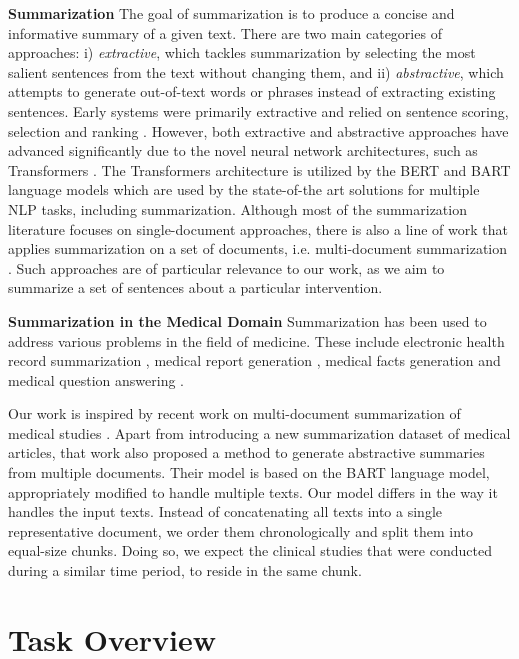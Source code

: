 \documentclass[11pt]{article}
\begin{document}
\textbf{Summarization} The goal of summarization is to produce a concise and informative summary of a given text. There are two main categories of approaches: i) \emph{extractive}, which tackles summarization by selecting the most salient sentences from the text without changing them, and ii) \emph{abstractive}, which attempts to generate out-of-text words or phrases instead of extracting existing sentences. Early systems were primarily extractive and relied on sentence scoring, selection and ranking \cite{allahyari2017text}. However, both extractive and abstractive approaches have advanced significantly due to the novel neural network architectures, such as Transformers \cite{vaswani2017attention}. The Transformers architecture is utilized by the BERT \cite{devlin2018bert} and BART \cite{lewis2019bart} language models which are used by the state-of-the art solutions for multiple NLP tasks, including summarization. Although most of the summarization literature focuses on single-document approaches, there is also a line of work that applies summarization on a set of documents, i.e. multi-document summarization \cite{ma2020multi}.  Such approaches are of particular relevance to our work, as we aim to summarize a set of sentences about a particular intervention.

\textbf{Summarization in the Medical Domain}
Summarization has been used to address various problems in the field of medicine. These include electronic health record summarization \cite{liang2019novel}, medical report generation \cite{zhang2019optimizing, liu2021competence}, medical facts generation \cite{wallace2021generating, wadden2020fact} and medical question answering \cite{demner2006answer, nentidis2021overview}. 

Our work is inspired by recent work on multi-document summarization of medical studies \cite{deyoung2021ms2}. Apart from introducing a new summarization dataset of medical articles, that work also proposed a method to generate abstractive summaries from multiple documents. Their model is based on the BART language model, appropriately modified to handle multiple texts. Our model differs in the way it handles the input texts. Instead of concatenating all texts into a single representative document, we order them chronologically and split them into equal-size chunks. Doing so, we expect the clinical studies that were conducted during a similar time period, to reside in the same chunk. 


\section{Task Overview}
\end{document}
